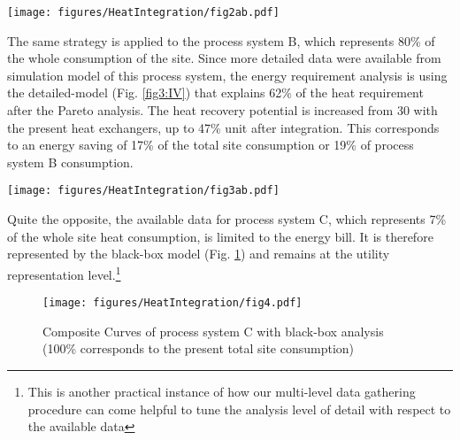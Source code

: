 \vspace{10pt}
\begin{figure*}[!ht]
\begin{center}
\texttt{[image: figures/HeatIntegration/fig2ab.pdf]}
\caption{Composite Curves of process system A from black-box to simple-model analysis with SPI (100\% corresponds to the present total site consumption)}
\label{fig3:III}
\end{center}
\end{figure*}

The same strategy is applied to the process system B, which represents 80\% of the whole consumption of the site. Since more detailed data were available from simulation model of this process system, the energy requirement analysis is using the detailed-model (Fig. \ref{fig3:IV}) that explains 62\% of the heat requirement after the Pareto analysis. The heat recovery potential is increased from 30 with the present heat exchangers, up to 47\% unit after integration. This corresponds to an energy saving of 17\% of the total site consumption or 19\% of process system B consumption.

 
\begin{figure*}[!ht]
\begin{center}
\texttt{[image: figures/HeatIntegration/fig3ab.pdf]}
\caption{Composite Curves of process system B from  black-box to detailed-model analysis with SPI (100\% corresponds to the present total site consumption)}
\label{fig3:IV}
\end{center}
\end{figure*}

Quite the opposite, the available data for process system C, which represents 7\% of the whole site heat consumption, is limited to the energy bill. It is therefore represented by the  black-box model (Fig. \ref{fig3:V}) and remains at the utility representation level.\footnote{This is another practical instance of how our multi-level data gathering procedure can come helpful to tune the analysis level of detail with respect to the available data} 
 
\vspace{10pt}
\begin{figure}[!ht]
\begin{center}
\texttt{[image: figures/HeatIntegration/fig4.pdf]}
\caption{Composite Curves of process system C with black-box analysis (100\% corresponds to the present total site consumption)}
\label{fig3:V}
\end{center}
\end{figure}

